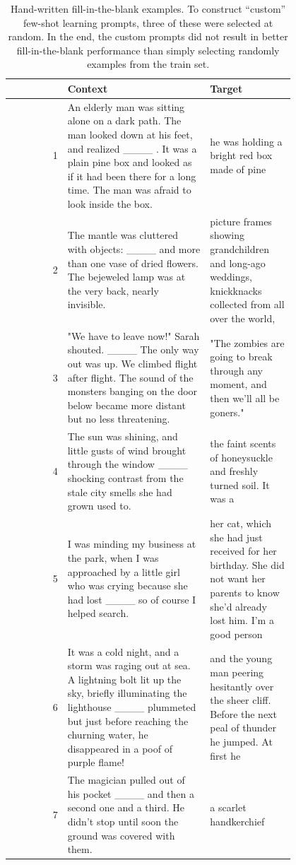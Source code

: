 \begin{table}
    \centering
    \small
    \begin{tabular}{r|p{0.5\linewidth}|p{0.3\linewidth}}
         \toprule
         & \textbf{Context} & \textbf{Target} \\
         \midrule
1 & An elderly man was sitting alone on a dark path. The man looked down at his feet, and realized \_\_\_\_ . It was a plain pine box and looked as if it had been there for a long time. The man was afraid to look inside the box. & he was holding a bright red box made of pine \\
\arrayrulecolor{lg} \midrule \arrayrulecolor{black}
2 & The mantle was cluttered with objects: \_\_\_\_ and more than one vase of dried flowers. The bejeweled lamp was at the very back, nearly invisible. & picture frames showing grandchildren and long-ago weddings, knickknacks collected from all over the world, \\
\arrayrulecolor{lg} \midrule \arrayrulecolor{black}
3 & "We have to leave now!" Sarah shouted. \_\_\_\_ The only way out was up. We climbed flight after flight. The sound of the monsters banging on the door below became more distant but no less threatening. & "The zombies are going to break through any moment, and then we'll all be goners." \\
\arrayrulecolor{lg} \midrule \arrayrulecolor{black}
4 & The sun was shining, and little gusts of wind brought through the window \_\_\_\_ shocking contrast from the stale city smells she had grown used to. & the faint scents of honeysuckle and freshly turned soil. It was a \\
\arrayrulecolor{lg} \midrule \arrayrulecolor{black}
5 & I was minding my business at the park, when I was approached by a little girl who was crying because she had lost \_\_\_\_ so of course I helped search. & her cat, which she had just received for her birthday. She did not want her parents to know she'd already lost him. I'm a good person \\
\arrayrulecolor{lg} \midrule \arrayrulecolor{black}
6 & It was a cold night, and a storm was raging out at sea. A lightning bolt lit up the sky, briefly illuminating the lighthouse \_\_\_\_ plummeted but just before reaching the churning water, he disappeared in a poof of purple flame! & and the young man peering hesitantly over the sheer cliff. Before the next peal of thunder he jumped. At first he  \\
\arrayrulecolor{lg} \midrule \arrayrulecolor{black}
7 & The magician pulled out of his pocket \_\_\_\_ and then a second one and a third. He didn't stop until soon the ground was covered with them. & a scarlet handkerchief  \\
         \bottomrule
    \end{tabular}
    \caption{Hand-written fill-in-the-blank examples.
     To construct ``custom'' few-shot learning prompts, three of these were selected at random.
    In the end, the custom prompts did not result in better fill-in-the-blank performance than simply selecting randomly examples from the train set.
    }
    \label{tab:custom_examples}
\end{table}


